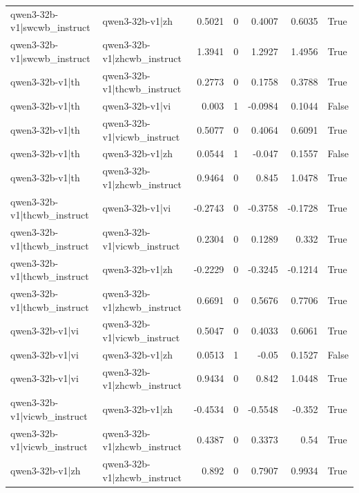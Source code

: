 \begin{table}
\begin{tabular}{l l r r r r l}
qwen3-32b-v1|swcwb_instruct & qwen3-32b-v1|zh & 0.5021 & 0 & 0.4007 & 0.6035 & True \\
qwen3-32b-v1|swcwb_instruct & qwen3-32b-v1|zhcwb_instruct & 1.3941 & 0 & 1.2927 & 1.4956 & True \\
qwen3-32b-v1|th & qwen3-32b-v1|thcwb_instruct & 0.2773 & 0 & 0.1758 & 0.3788 & True \\
qwen3-32b-v1|th & qwen3-32b-v1|vi & 0.003 & 1 & -0.0984 & 0.1044 & False \\
qwen3-32b-v1|th & qwen3-32b-v1|vicwb_instruct & 0.5077 & 0 & 0.4064 & 0.6091 & True \\
qwen3-32b-v1|th & qwen3-32b-v1|zh & 0.0544 & 1 & -0.047 & 0.1557 & False \\
qwen3-32b-v1|th & qwen3-32b-v1|zhcwb_instruct & 0.9464 & 0 & 0.845 & 1.0478 & True \\
qwen3-32b-v1|thcwb_instruct & qwen3-32b-v1|vi & -0.2743 & 0 & -0.3758 & -0.1728 & True \\
qwen3-32b-v1|thcwb_instruct & qwen3-32b-v1|vicwb_instruct & 0.2304 & 0 & 0.1289 & 0.332 & True \\
qwen3-32b-v1|thcwb_instruct & qwen3-32b-v1|zh & -0.2229 & 0 & -0.3245 & -0.1214 & True \\
qwen3-32b-v1|thcwb_instruct & qwen3-32b-v1|zhcwb_instruct & 0.6691 & 0 & 0.5676 & 0.7706 & True \\
qwen3-32b-v1|vi & qwen3-32b-v1|vicwb_instruct & 0.5047 & 0 & 0.4033 & 0.6061 & True \\
qwen3-32b-v1|vi & qwen3-32b-v1|zh & 0.0513 & 1 & -0.05 & 0.1527 & False \\
qwen3-32b-v1|vi & qwen3-32b-v1|zhcwb_instruct & 0.9434 & 0 & 0.842 & 1.0448 & True \\
qwen3-32b-v1|vicwb_instruct & qwen3-32b-v1|zh & -0.4534 & 0 & -0.5548 & -0.352 & True \\
qwen3-32b-v1|vicwb_instruct & qwen3-32b-v1|zhcwb_instruct & 0.4387 & 0 & 0.3373 & 0.54 & True \\
qwen3-32b-v1|zh & qwen3-32b-v1|zhcwb_instruct & 0.892 & 0 & 0.7907 & 0.9934 & True \\
\bottomrule
\end{tabular}
\end{table}
